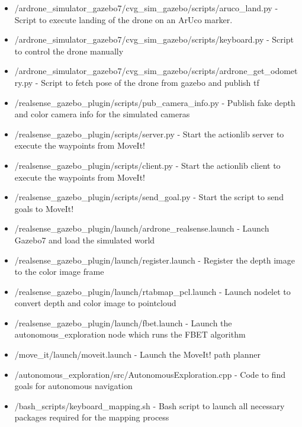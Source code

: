 \documentclass[a4paper,12pt,oneside]{book}
\begin{document}
\begin{itemize}

	\item /ardrone\_simulator\_gazebo7/cvg\_sim\_gazebo/scripts/aruco\_land.py - Script to execute landing of the drone on an ArUco marker.

	\item /ardrone\_simulator\_gazebo7/cvg\_sim\_gazebo/scripts/keyboard.py - Script to control the drone manually
	
	\item /ardrone\_simulator\_gazebo7/cvg\_sim\_gazebo/scripts/ardrone\_get\_odometry.py - Script to fetch pose of the drone from gazebo and publish tf
	
	\item /realsense\_gazebo\_plugin/scripts/pub\_camera\_info.py - Publish fake depth and color camera info for the simulated cameras
	
	\item /realsense\_gazebo\_plugin/scripts/server.py - Start the actionlib server to execute the waypoints from MoveIt!
	
	\item /realsense\_gazebo\_plugin/scripts/client.py - Start the actionlib client to execute the waypoints from MoveIt!
	
	\item /realsense\_gazebo\_plugin/scripts/send\_goal.py - Start the script to send goals to MoveIt!
	
	\item /realsense\_gazebo\_plugin/launch/ardrone\_realsense.launch - Launch Gazebo7 and load the simulated world
	
	\item /realsense\_gazebo\_plugin/launch/register.launch - Register the depth image to the color image frame
	
	\item /realsense\_gazebo\_plugin/launch/rtabmap\_pcl.launch - Launch nodelet to convert depth and color image to pointcloud
	
	\item /realsense\_gazebo\_plugin/launch/fbet.launch - Launch the autonomous\_exploration node which runs the FBET algorithm
	
	\item /move\_it/launch/moveit.launch - Launch the MoveIt! path planner
	
	\item /autonomous\_exploration/src/AutonomousExploration.cpp - Code to find goals for autonomous navigation	
	
	\item /bash\_scripts/keyboard\_mapping.sh - Bash script to launch all necessary packages required for the mapping process
	
\end{itemize}
\end{document}
